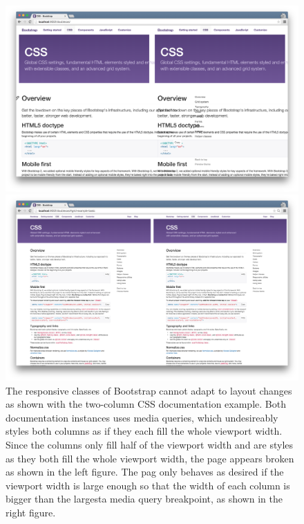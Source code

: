 \documentclass[a4paper,11pt]{kth-mag}
\begin{document}
      \begin{figure}[htbp]
        \centering
        \begin{minipage}{.5\textwidth}
          \centering
          \includegraphics[width=\linewidth]{images/bootstrap-mq-header-small}
        \end{minipage}%
        \begin{minipage}{.5\textwidth}
          \centering
          \includegraphics[width=\linewidth]{images/bootstrap-mq-header-big}
        \end{minipage}
        \caption{
          The responsive classes of Bootstrap cannot adapt to layout changes as shown with the two-column \gls{CSS} documentation example.
          Both documentation instances uses media queries, which undesireably styles both columns as if they each fill the whole viewport width.
          Since the columns only fill half of the viewport width and are styles as they both fill the whole viewport width, the page appears broken as shown in the left figure.
          The pag only behaves as desired if the viewport width is large enough so that the width of each column is bigger than the largesta media query breakpoint, as shown in the right figure.}
        \label{fig:eval-bootstrap-mq-broken}
      \end{figure}
\end{document}
